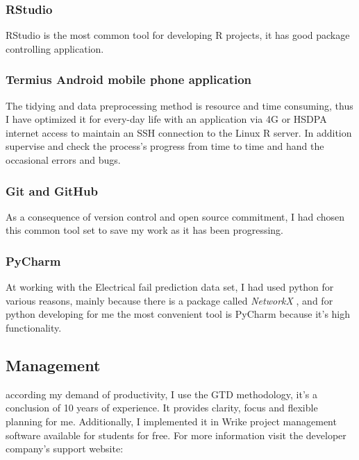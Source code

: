 			\subsubsection{RStudio}
RStudio is the most common tool for developing R projects, it has good package controlling application.
\cite{RStudio}
			\subsubsection{Termius Android mobile phone application}
The tidying and data preprocessing method is resource and time consuming, thus I have optimized it for every-day life with an application via 4G or HSDPA internet access to maintain an SSH connection to the Linux R server. In addition supervise and check the process's progress from time to time and hand the occasional errors and bugs.
\cite{Termius}
			\subsubsection{Git and GitHub}
As a consequence of version control and open source commitment, I had chosen this common tool set to save my work as it has been progressing.
\cite{Github}
			\subsubsection{PyCharm}
At working with the Electrical fail prediction data set, I had used python for various reasons, mainly because there is a package called \textit{NetworkX} \cite{NetworkX}, and for python developing for me the most convenient tool is PyCharm because it's high functionality.
\cite{PyCharm}	
		\subsection{Management}
according my demand of productivity, I use the GTD\cite{GTD} methodology, it's a conclusion of 10 years of experience. It provides clarity, focus and flexible planning for me. Additionally, I implemented it in Wrike \cite{WRIKE} project management software available for students for free. For more information visit the developer company's support website: \cite{WRIKE_for_students}
